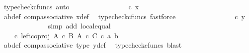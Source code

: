 \begin{isabellebody}
\ {\isacharparenleft}{\kern0pt}typecheck{\isacharunderscore}{\kern0pt}cfuncs{\isacharcomma}{\kern0pt}\ auto{\isacharparenright}{\kern0pt}\isanewline
\ \ \ \ \ \ \ \ \ \ \isamarkupfalse%
\ \isamarkupfalse%
\ {\isachardoublequoteopen}{\isachardot}{\kern0pt}{\isachardot}{\kern0pt}{\isachardot}{\kern0pt}\ {\isacharequal}{\kern0pt}\ {\isasymphi}\ {\isasymcirc}\isactrlsub c\ x{\isachardoublequoteclose}\isanewline
\ \ \ \ \ \ \ \ \ \ \ \ \isamarkupfalse%
\ ab{\isacharunderscore}{\kern0pt}def\ comp{\isacharunderscore}{\kern0pt}associative{}\ x{\isacharprime}{\kern0pt}{\isacharunderscore}{\kern0pt}def\ \isamarkupfalse%
\ {\isacharparenleft}{\kern0pt}typecheck{\isacharunderscore}{\kern0pt}cfuncs{\isacharcomma}{\kern0pt}\ fastforce{\isacharparenright}{\kern0pt}\isanewline
\ \ \ \ \ \ \ \ \ \ \isamarkupfalse%
\ \isamarkupfalse%
\ {\isachardoublequoteopen}{\isachardot}{\kern0pt}{\isachardot}{\kern0pt}{\isachardot}{\kern0pt}\ {\isacharequal}{\kern0pt}\ {\isasymphi}\ {\isasymcirc}\isactrlsub c\ y{\isachardoublequoteclose}\isanewline
\ \ \ \ \ \ \ \ \ \ \ \ \isamarkupfalse%
\ {\isacharparenleft}{\kern0pt}simp\ add{\isacharcolon}{\kern0pt}\ local{\isachardot}{\kern0pt}equal{\isacharparenright}{\kern0pt}\isanewline
\ \ \ \ \ \ \ \ \ \ \isamarkupfalse%
\ \isamarkupfalse%
\ {\isachardoublequoteopen}{\isachardot}{\kern0pt}{\isachardot}{\kern0pt}{\isachardot}{\kern0pt}\ {\isacharequal}{\kern0pt}\ {\isacharparenleft}{\kern0pt}{\isasymphi}\ {\isasymcirc}\isactrlsub c\ left{\isacharunderscore}{\kern0pt}coproj\ {\isacharparenleft}{\kern0pt}A\ {\isasymtimes}\isactrlsub c\ B{\isacharparenright}{\kern0pt}\ {\isacharparenleft}{\kern0pt}A\ {\isasymtimes}\isactrlsub c\ C{\isacharparenright}{\kern0pt}{\isacharparenright}{\kern0pt}\ {\isasymcirc}\isactrlsub c\ {\isasymlangle}a{\isacharprime}{\kern0pt}{\isacharcomma}{\kern0pt}\ b{\isacharprime}{\kern0pt}{\isasymrangle}{\isachardoublequoteclose}\isanewline
\ \ \ \ \ \ \ \ \ \ \ \ \isamarkupfalse%
\ a{\isacharprime}{\kern0pt}b{\isacharprime}{\kern0pt}{\isacharunderscore}{\kern0pt}def\ comp{\isacharunderscore}{\kern0pt}associative{}\ {\isasymphi}{\isacharunderscore}{\kern0pt}type\ y{\isacharprime}{\kern0pt}{\isacharunderscore}{\kern0pt}def\ \isamarkupfalse%
\ {\isacharparenleft}{\kern0pt}typecheck{\isacharunderscore}{\kern0pt}cfuncs{\isacharcomma}{\kern0pt}\ blast{\isacharparenright}{\kern0pt}\isanewline
\ \ \ \ \ \ \ \ \ \ \isamarkupfalse%

\end{isabellebody}
